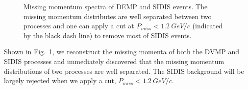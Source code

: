 \begin{figure}[!ht]
 \begin{center}
   \caption[Missing Momentum]{\footnotesize{Missing momentum spectra of DEMP and SIDIS events. The missing momentum distributes are well separated between two processes and one can apply a cut at $P_{miss}<1.2~GeV/c$ (indicated by the black dash line) to remove most of SIDIS events.}}
  \label{missing_mom}
  \end{center}
\end{figure}
Shown in Fig.~\ref{missing_mom}, we reconstruct the missing momenta of both the DVMP and SIDIS processes and immediately discovered that the missing momentum distributions of two processes are well separated. The SIDIS background will be largely rejected when we apply a cut, $P_{miss}<1.2~GeV/c$. 

